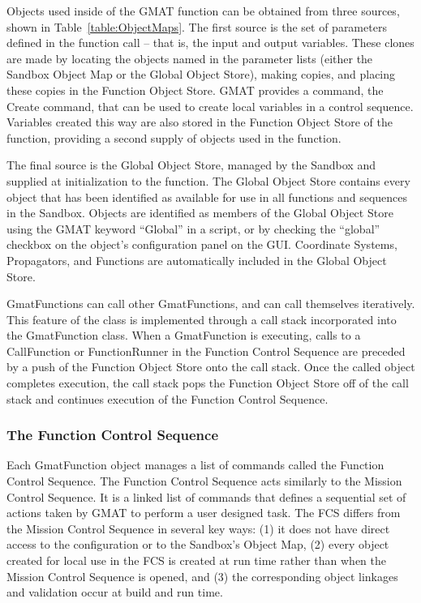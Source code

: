 Objects used inside of the GMAT function can be obtained from three sources, shown in
Table~\ref{table:ObjectMaps}. The first source is the set of parameters defined in the function call
-- that is, the input and output variables.  These clones are made by locating the objects named in
the parameter lists (either the Sandbox Object Map or the Global Object Store), making copies, and
placing these copies in the Function Object Store.  GMAT provides a command, the Create command,
that can be used to create local variables in a control sequence.  Variables created this way are
also stored in the Function Object Store of the function, providing a second supply of objects used
in the function.

The final source is the Global Object Store, managed by the Sandbox and supplied at initialization
to the function.  The Global Object Store contains every object that has been identified as
available for use in all functions and sequences in the Sandbox.  Objects are identified as members
of the Global Object Store using the GMAT keyword ``Global'' in a script, or by checking the
``global'' checkbox on the object's configuration panel on the GUI.  Coordinate Systems,
Propagators, and Functions are automatically included in the Global Object Store.

GmatFunctions can call other GmatFunctions, and can call themselves iteratively.  This feature of
the class is implemented through a call stack incorporated into the GmatFunction class.  When a
GmatFunction is executing, calls to a CallFunction or FunctionRunner in the Function Control
Sequence are preceded by a push of the Function Object Store onto the call stack.  Once the
called object completes execution, the call stack pops the Function Object Store off of the call
stack and continues execution of the Function Control Sequence.

\subsubsection{The Function Control Sequence}

Each GmatFunction object manages a list of commands called the Function Control Sequence.  The
Function Control Sequence acts similarly to the Mission Control Sequence.  It is a linked list of
commands that defines a sequential set of actions taken by GMAT to perform a user designed task. 
The FCS differs from the Mission Control Sequence in several key ways: (1) it does not have direct
access to the configuration or to the Sandbox's Object Map, (2) every object created for
local use in the FCS is created at run time rather than when the Mission Control Sequence is opened,
and (3) the corresponding object linkages and validation occur at build and run time.

